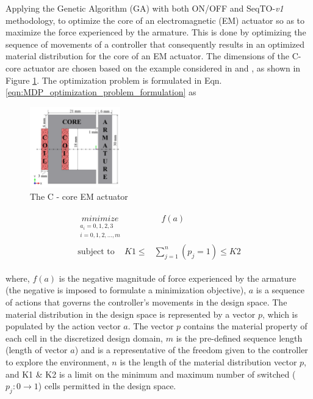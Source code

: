 Applying the Genetic Algorithm (GA) with both ON/OFF and SeqTO-\textit{v1} methodology, to optimize the core of an electromagnetic (EM) actuator so as to maximize the force experienced by the armature. This is done by optimizing the sequence of movements of a controller that consequently results in an optimized material distribution for the core of an EM actuator. The dimensions of the C-core actuator are chosen based on the example considered in \cite{park2009} and \cite{midha2019selection}, as shown in Figure \ref{fig:MDP_c_core_full}. The optimization problem is formulated in Eqn. \ref{eqn:MDP_optimization_problem_formulation} as

\begin{figure}[h!]
    \centering
    \includegraphics[width=0.35\textwidth]{Figures/Ch_MDP/c_core_full.png}
    \caption{The C - core EM actuator}
    \label{fig:MDP_c_core_full}
\end{figure}

\begin{align}
    \begin{split}
        \underset{\substack{a_i = {0, 1, 2, 3} \\ i = 0, 1, 2, \hdots, m}}{minimize} & \hspace{10pt} f(a) \\
        \text{subject to} \hspace{14pt} K1 \leq & \sum_{j=1}^n (p_j = 1) \leq K2 \label{eqn:MDP_optimization_problem_formulation}
    \end{split}
\end{align}

where, $f(a)$ is the negative magnitude of force experienced by the armature (the negative is imposed to formulate a minimization objective), $a$ is a sequence of actions that governs the controller's movements in the design space. The material distribution in the design space is represented by a vector $p$, which is populated by the action vector $a$. The vector $p$ contains the material property of each cell in the discretized design domain, $m$ is the pre-defined sequence length (length of vector $a$) and is a representative of the freedom given to the controller to explore the environment, $n$ is the length of the material distribution vector $p$, and K1 \& K2 is a limit on the minimum and maximum number of switched ($p_j: 0 \rightarrow 1$) cells permitted in the design space. 

